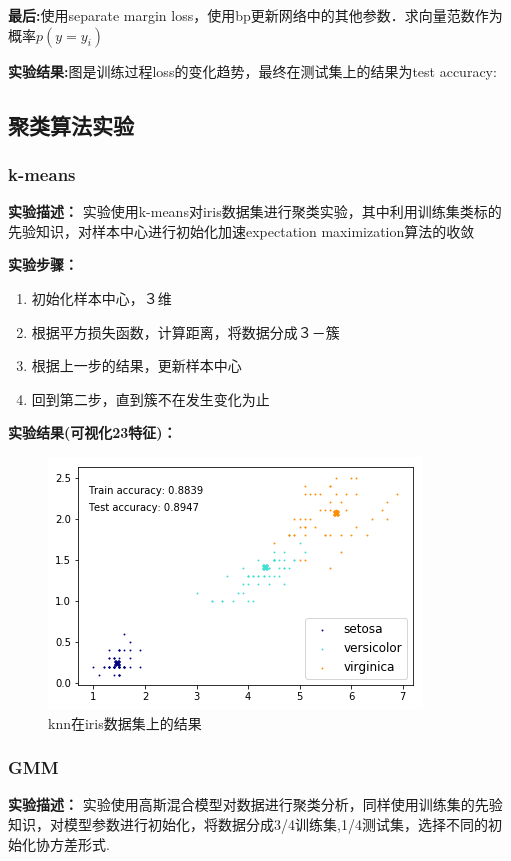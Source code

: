 \documentclass{article}
\begin{document}
\textbf{最后:}使用separate margin loss，使用bp更新网络中的其他参数．求向量范数作为概率$p(y=y_i)$

\textbf{实验结果:}图是训练过程loss的变化趋势，最终在测试集上的结果为test accuracy:

\subsection{聚类算法实验}
\subsubsection{k-means}
\textbf{实验描述：}
实验使用k-means对iris数据集进行聚类实验，其中利用训练集类标的先验知识，对样本中心进行初始化加速expectation maximization算法的收敛

\textbf{实验步骤：}
\begin{enumerate}
\item 初始化样本中心，３维
\item 根据平方损失函数，计算距离，将数据分成３－簇
\item 根据上一步的结果，更新样本中心
\item 回到第二步，直到簇不在发生变化为止 
\end{enumerate}

\textbf{实验结果(可视化23特征)：}
\begin{figure}[htbp]
	\centering\includegraphics[scale=1.1]{knn_iris}
	\caption{knn在iris数据集上的结果}
\end{figure}
\subsubsection{GMM}
\textbf{实验描述：}
实验使用高斯混合模型对数据进行聚类分析，同样使用训练集的先验知识，对模型参数进行初始化，将数据分成3/4训练集,1/4测试集，选择不同的初始化协方差形式.
\end{document}
